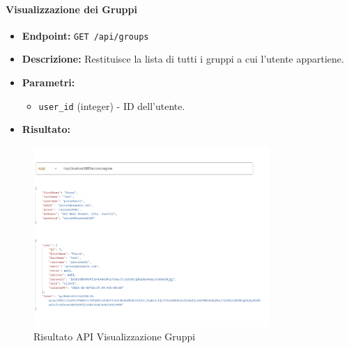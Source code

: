 \paragraph{Visualizzazione dei Gruppi}
\begin{itemize}
    \item \textbf{Endpoint:} \texttt{GET /api/groups}
    \item \textbf{Descrizione:} Restituisce la lista di tutti i gruppi a cui l'utente appartiene.
    \item \textbf{Parametri:}
    \begin{itemize}
        \item \texttt{user\_id} (integer) - ID dell'utente.
    \end{itemize}
    \item \textbf{Risultato:}
\end{itemize}
\begin{figure}[H]
    \centering
    \includegraphics[width=0.8\textwidth]{images/registerapi.png}
    \caption{Risultato API Visualizzazione Gruppi}
    \label{fig:api_view_groups}
\end{figure}


